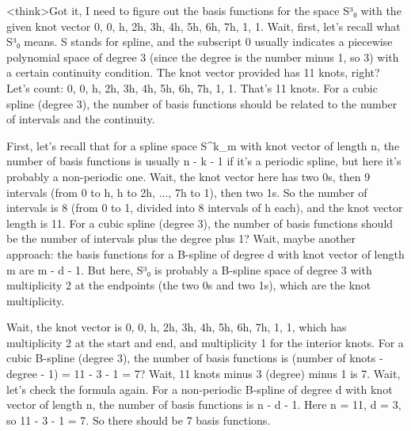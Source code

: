 <think>Got it, I need to figure out the basis functions for the space S³₀ with the given knot vector {0, 0, h, 2h, 3h, 4h, 5h, 6h, 7h, 1, 1}. Wait, first, let's recall what S³₀ means. S stands for spline, and the subscript 0 usually indicates a piecewise polynomial space of degree 3 (since the degree is the number minus 1, so 3) with a certain continuity condition. The knot vector provided has 11 knots, right? Let's count: 0, 0, h, 2h, 3h, 4h, 5h, 6h, 7h, 1, 1. That's 11 knots. For a cubic spline (degree 3), the number of basis functions should be related to the number of intervals and the continuity. 

First, let's recall that for a spline space S^k_m with knot vector of length n, the number of basis functions is usually n - k - 1 if it's a periodic spline, but here it's probably a non-periodic one. Wait, the knot vector here has two 0s, then 9 intervals (from 0 to h, h to 2h, ..., 7h to 1), then two 1s. So the number of intervals is 8 (from 0 to 1, divided into 8 intervals of h each), and the knot vector length is 11. For a cubic spline (degree 3), the number of basis functions should be the number of intervals plus the degree plus 1? Wait, maybe another approach: the basis functions for a B-spline of degree d with knot vector of length m are m - d - 1. But here, S³₀ is probably a B-spline space of degree 3 with multiplicity 2 at the endpoints (the two 0s and two 1s), which are the knot multiplicity. 

Wait, the knot vector is {0, 0, h, 2h, 3h, 4h, 5h, 6h, 7h, 1, 1}, which has multiplicity 2 at the start and end, and multiplicity 1 for the interior knots. For a cubic B-spline (degree 3), the number of basis functions is (number of knots - degree - 1) = 11 - 3 - 1 = 7? Wait, 11 knots minus 3 (degree) minus 1 is 7. Wait, let's check the formula again. For a non-periodic B-spline of degree d with knot vector of length n, the number of basis functions is n - d - 1. Here n = 11, d = 3, so 11 - 3 - 1 = 7. So there should be 7 basis functions. 

